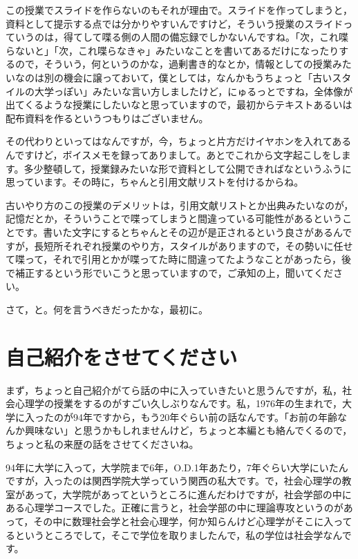 \documentclass{ltjsbook}
\begin{document}
この授業でスライドを作らないのもそれが理由で。スライドを作ってしまうと，資料として提示する点では分かりやすいんですけど，そういう授業のスライドっていうのは，得てして喋る側の人間の備忘録でしかないんですね。「次，これ喋らないと」「次，これ喋らなきゃ」みたいなことを書いてあるだけになったりするので，そういう，何というのかな，過剰書き的なとか，情報としての授業みたいなのは別の機会に譲っておいて，僕としては，なんかもうちょっと「古いスタイルの大学っぽい」みたいな言い方しましたけど，にゅるっとですね，全体像が出てくるような授業にしたいなと思っていますので，最初からテキストあるいは配布資料を作るというつもりはございません。

その代わりといってはなんですが，今，ちょっと片方だけイヤホンを入れてあるんですけど，ボイスメモを録ってありまして。あとでこれから文字起こしをします。多少整頓して，授業録みたいな形で資料として公開できればなというふうに思っています。その時に，ちゃんと引用文献リストを付けるからね。

古いやり方のこの授業のデメリットは，引用文献リストとか出典みたいなのが，記憶だとか，そういうことで喋ってしまうと間違っている可能性があるということです。書いた文字にするとちゃんとその辺が是正されるという良さがあるんですが，長短所それぞれ授業のやり方，スタイルがありますので，その勢いに任せて喋って，それで引用とかが喋ってた時に間違ってたようなことがあったら，後で補正するという形でいこうと思っていますので，ご承知の上，聞いてください。


さて，と。何を言うべきだったかな，最初に。

\section{自己紹介をさせてください}

まず，ちょっと自己紹介がてら話の中に入っていきたいと思うんですが，私，社会心理学の授業をするのがすごい久しぶりなんです。私，1976年の生まれで，大学に入ったのが94年ですから，もう20年ぐらい前の話なんです。「お前の年齢なんか興味ない」と思うかもしれませんけど，ちょっと本編とも絡んでくるので，ちょっと私の来歴の話をさせてくださいね。

94年に大学に入って，大学院まで6年，O.D.1年あたり，7年ぐらい大学にいたんですが，入ったのは関西学院大学っていう関西の私大です。で，社会心理学の教室があって，大学院があってというところに進んだわけですが，社会学部の中にある心理学コースでした。正確に言うと，社会学部の中に理論専攻というのがあって，その中に数理社会学と社会心理学，何か知らんけど心理学がそこに入ってるというところでして，そこで学位を取りましたんで，私の学位は社会学なんです。
\end{document}

